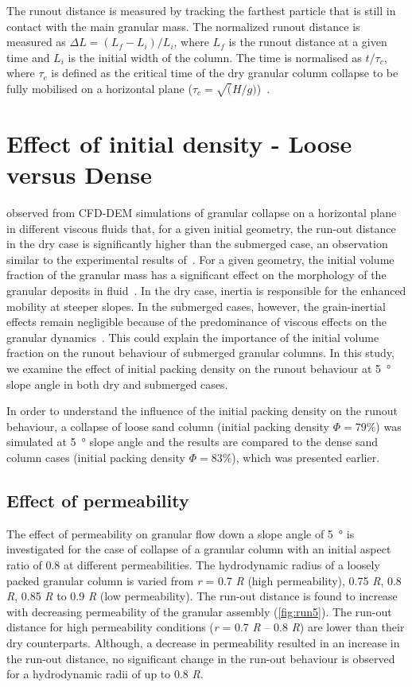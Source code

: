 \documentclass[12pt,twoside]{tuhhproc-en}
\begin{document}
The runout distance is measured by tracking the farthest particle that is still in contact with the main granular mass. The normalized runout distance is measured as $\Delta L = (L_f - L_i)/ L_i$, where $L_f$ is the runout distance at a given time and $L_i$ is the initial width of the column. The time is normalised as $t / \tau_c$, where $\tau_c$ is defined as the critical time of the dry granular column collapse to be fully mobilised on a horizontal plane ($\tau_c = \sqrt(H/g)$)~\citep{Staron2007a}.

\section{Effect of initial density - Loose versus Dense}
\citet{Topin2011} observed from CFD-DEM simulations of granular collapse on a horizontal plane in different viscous fluids that, for a given initial geometry, the run-out distance in the dry case is significantly higher than the submerged case, an observation similar to the experimental results of~\citet{Cassar2005}. For a given geometry, the initial volume fraction of the granular mass has a significant effect on the morphology of the granular deposits in fluid~\citep{Rondon2011a, Pailha2008}. In the dry case, inertia is responsible for the enhanced mobility at steeper slopes. In the submerged cases, however, the grain-inertial effects remain negligible because of the predominance of viscous effects on the granular dynamics~\citep{Topin2011}. This could explain the importance of the initial volume fraction on the runout behaviour of submerged granular columns. In this study, we examine the effect of initial packing density on the runout behaviour at \SI{5}{\degree} slope angle in both dry and submerged cases. 

In order to understand the influence of the initial packing density on the runout behaviour, a collapse of loose sand column (initial packing density $\Phi = 79\%$) was simulated at \SI{5}{\degree} slope angle and the results are compared to the dense sand column cases (initial packing density $\Phi = 83\%$), which was presented earlier. 

\subsection{Effect of permeability}

The effect of permeability on granular flow down a slope 
angle of \SI{5}{\degree} is investigated for the case of collapse of a granular column with an initial aspect ratio of 0.8 at different permeabilities. The 
hydrodynamic radius of a loosely packed granular column is varied from 
\textit{r} = 0.7 \textit{R} (high permeability), 0.75 \textit{R}, 0.8 
\textit{R}, 0.85 \textit{R} to 0.9 \textit{R} (low permeability). The run-out 
distance is found to increase with decreasing permeability of the granular 
assembly (\cref{fig:run5}). The run-out distance for high permeability 
conditions (\textit{r} = 0.7 \textit{R} -- 0.8 \textit{R}) are lower than their 
dry counterparts. Although, a decrease in permeability resulted in an increase 
in the run-out distance, no significant change in the run-out behaviour is 
observed for a hydrodynamic radii of up to 0.8 \textit{R}.
\end{document}
